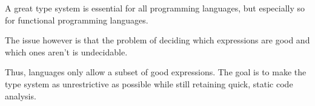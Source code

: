 A great type system is essential for all programming languages, but especially so for functional programming languages.

The issue however is that the problem of deciding which expressions are good and which ones aren't is undecidable.

Thus, languages only allow a subset of good expressions.
The goal is to make the type system as unrestrictive as possible while still retaining quick, static code analysis.
